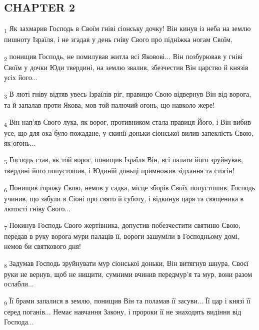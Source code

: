 \subsection{CHAPTER 2}
\begin{tcolorbox}
\textsubscript{1} Як захмарив Господь в Своїм гніві сіонську дочку! Він кинув із неба на землю пишноту Ізраїля, і не згадав у день гніву Свого про підніжка ногам Своїм,
\end{tcolorbox}
\begin{tcolorbox}
\textsubscript{2} понищив Господь, не помилував житла всі Яковові... Він позбурював у гніві Своїм у дочки Юди твердині, на землю звалив, збезчестив Він царство й князів усіх його...
\end{tcolorbox}
\begin{tcolorbox}
\textsubscript{3} В люті гніву відтяв увесь Ізраїлів ріг, правицю Свою відвернув Він від ворога, та й запалав проти Якова, мов той палючий огонь, що навколо жере!
\end{tcolorbox}
\begin{tcolorbox}
\textsubscript{4} Він нап'яв Свого лука, як ворог, противником стала правиця Його, і Він вибив усе, що для ока було пожадане, у скинії доньки сіонської вилив запеклість Свою, як огонь...
\end{tcolorbox}
\begin{tcolorbox}
\textsubscript{5} Господь став, як той ворог, понищив Ізраїля Він, всі палати його зруйнував, твердині його попустошив, і Юдиній доньці примножив зідхання та стогін!
\end{tcolorbox}
\begin{tcolorbox}
\textsubscript{6} Понищив горожу Свою, немов у садка, місце зборів Своїх попустошив, Господь учинив, що забули в Сіоні про свято й суботу, і відкинув царя та священика в лютості гніву Свого...
\end{tcolorbox}
\begin{tcolorbox}
\textsubscript{7} Покинув Господь Свого жертівника, допустив побезчестити святиню Свою, передав в руку ворога мури палаців її, вороги зашуміли в Господньому домі, немов би святкового дня!
\end{tcolorbox}
\begin{tcolorbox}
\textsubscript{8} Задумав Господь зруйнувати мур сіонської доньки, Він витягнув шнура, Своєї руки не вернув, щоб не нищити, сумними вчинив передмур'я та мур, вони разом ослабли...
\end{tcolorbox}
\begin{tcolorbox}
\textsubscript{9} Її брами запалися в землю, понищив Він та поламав її засуви... Її цар і князі її серед поганів... Немає навчання Закону, і пророки її не знаходять видіння від Господа...
\end{tcolorbox}
